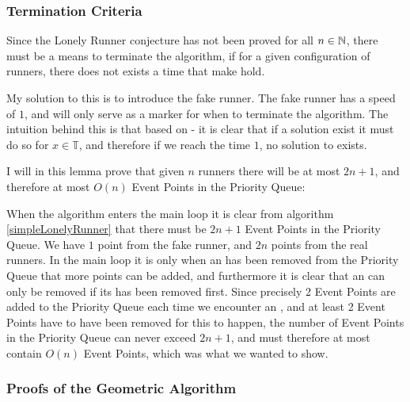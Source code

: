 \subsubsection{Termination Criteria}
\label{termination}
Since the Lonely Runner conjecture has not been proved for all $n \in \mathbb{N}$, there must be a means to terminate the algorithm, if for a given configuration of runners, there does not exists a time that make  hold.

My solution to this is to introduce the fake runner. The fake runner has a speed of $1$, and will only serve as a marker for when to terminate the algorithm. The intuition behind this is that based on  - it is clear that if a solution exist it must do so for $x \in \mathbb{T}$, and therefore if we reach the time $1$, no solution to  exists.

\begin{lemma}
\label{maximum_event_points}
I will in this lemma prove that given $n$ runners there will be at most $2n + 1$, and therefore at most $O(n)$ Event Points in the Priority Queue:

When the algorithm enters the main loop it is clear from algorithm \ref{simpleLonelyRunner} that there must be $2n + 1$ Event Points in the Priority Queue. We have $1$ point from the fake runner, and $2n$ points from the real runners. In the main loop it is only when an \comEnd has been removed from the Priority Queue that more points can be added, and furthermore it is clear that an \comEnd can only be removed if its \comStart\;has been removed first. Since precisely 2 Event Points are added to the Priority Queue each time we encounter an \comEnd, and at least 2 Event Points have to have been removed for this to happen, the number of Event Points in the Priority Queue can never exceed $2n + 1$, and must therefore at most contain $O(n)$ Event Points, which was what we wanted to show.
\end{lemma}

\subsubsection{Proofs of the Geometric Algorithm}
\label{proof_geo}

